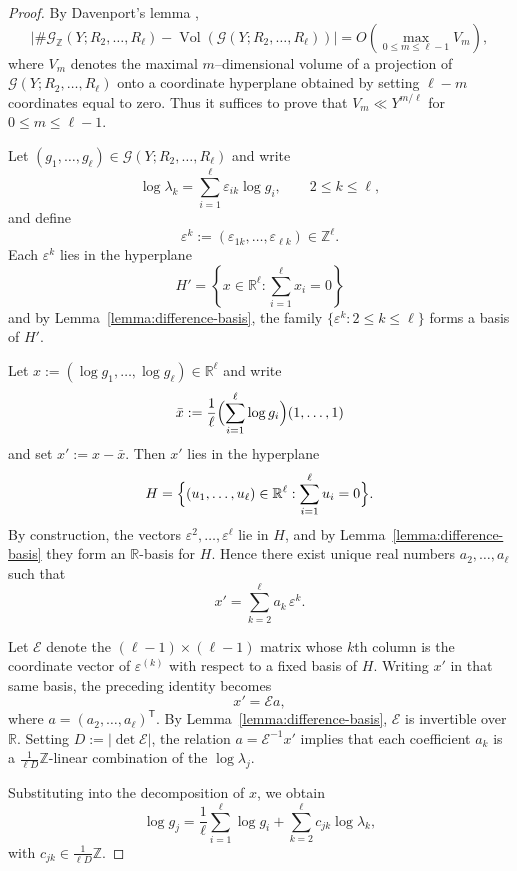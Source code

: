 \documentclass{amsart}
\theoremstyle{plain}
\theoremstyle{definition}
\theoremstyle{remark}
\numberwithin{equation}{section}
\begin{document}
\begin{proof}
By Davenport's lemma \cite[Theorem on p.~180]{Davenport},
\[
\bigl|
\#\mathcal G_{\mathbb Z}(Y;R_2,\dots,R_\ell)
-
\operatorname{Vol}\!\left(
\mathcal G(Y;R_2,\dots,R_\ell)
\right)
\bigr|
=
O\!\left(
\max_{0\le m\le \ell-1} V_m
\right),
\]
where $V_m$ denotes the maximal $m$–dimensional volume of a projection of
$\mathcal G(Y;R_2,\dots,R_\ell)$
onto a coordinate hyperplane obtained by setting $\ell-m$ coordinates equal to zero. Thus it suffices to prove that $V_m \ll Y^{m/\ell}$ for $0\le m\le \ell-1$.
\par Let $(g_1,\dots,g_\ell)\in
\mathcal G(Y;R_2,\dots,R_\ell)$ and write
\[
\log \lambda_k
=
\sum_{i=1}^{\ell}
\varepsilon_{ik} \log g_i,
\qquad 2\le k\le \ell,
\]
and define
\[
\varepsilon^{k}
:=
(\varepsilon_{1k},\dots,\varepsilon_{\ell k})
\in \mathbb Z^\ell.
\]
Each $\varepsilon^{k}$ lies in the hyperplane
\[
H'
=
\left\{
x\in\mathbb R^\ell:
\sum_{i=1}^{\ell} x_i=0
\right\}
\]and by Lemma~\ref{lemma:difference-basis},
the family $\{\varepsilon^{k} : 2\le k\le \ell\}$ forms a basis of $H'$.
\par
Let $x := (\log g_1,\dots,\log g_\ell)\in \mathbb R^\ell$ and
write
\[
\bar x
:=
\frac{1}{\ell}
\Bigl(
\sum_{i=1}^{\ell} \log g_i
\Bigr)
(1,\dots,1)
\]
and set $x' := x-\bar x$. Then $x'$ lies in the hyperplane
\[
H=\Bigl\{(u_1,\dots,u_\ell)\in\mathbb R^\ell :
\sum_{i=1}^{\ell} u_i=0\Bigr\}.
\]
By construction, the vectors $\varepsilon^{2},\dots,\varepsilon^{\ell}$ lie in $H$, and by Lemma~\ref{lemma:difference-basis} they form an
$\mathbb R$-basis for $H$. Hence there exist unique real numbers $a_2,\dots,a_\ell$ such that
\[
x'
=
\sum_{k=2}^{\ell} a_k\, \varepsilon^{k}.
\]

Let $\mathcal E$ denote the $(\ell-1)\times(\ell-1)$ matrix whose
$k$th column is the coordinate vector of $\varepsilon^{(k)}$
with respect to a fixed basis of $H$.
Writing $x'$ in that same basis,
the preceding identity becomes
\[
x' = \mathcal E a,
\]
where $a=(a_2,\dots,a_\ell)^{\mathsf T}$.
By Lemma~\ref{lemma:difference-basis}, $\mathcal E$ is invertible over $\mathbb R$. Setting $D:=|\det \mathcal{E}|$, the relation $a
=
\mathcal E^{-1} x'$ implies that each coefficient $a_k$
is a $\frac{1}{\ell D}\mathbb Z$-linear combination of the
$\log \lambda_j$.

Substituting into the decomposition of $x$, we obtain
\[
\log g_j
=
\frac1\ell
\sum_{i=1}^{\ell}\log g_i
+
\sum_{k=2}^{\ell}
c_{jk}\log \lambda_k,
\]
with
$c_{jk}\in \frac{1}{\ell D}\mathbb Z$.


\end{proof}
\end{document}
